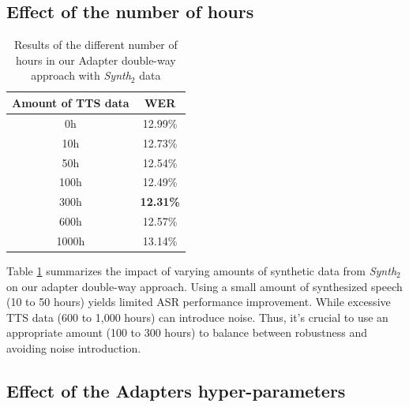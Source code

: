 
\subsection{Effect of the number of hours}
\begin{table}[t]
\centering
\begin{tabular}{cc}
\hline
 Amount of TTS data & WER    \\ \hline
\multicolumn{1}{c}{0h} & 12.99\% \\ \hline
\multicolumn{1}{c}{10h}  &   12.73\%   \\ 
\multicolumn{1}{c}{50h}    & 12.54\%   \\ 
\multicolumn{1}{c}{100h} & 12.49\%  \\ 
\multicolumn{1}{c}{300h} & \textbf{12.31\%}  \\ 
\multicolumn{1}{c}{600h} & 12.57\%  \\ 
\multicolumn{1}{c}{1000h} & 13.14\%  \\ \hline

\end{tabular}

\caption{Results of the different number of hours in our Adapter double-way approach with \textit{Synth$_2$} data}
\label{tab:hours}
\end{table}

Table \ref{tab:hours} summarizes the impact of varying amounts of synthetic data from \textit{Synth$_2$} on our adapter double-way approach. Using a small amount of synthesized speech (10 to 50 hours) yields limited ASR performance improvement. While excessive TTS data (600 to 1,000 hours) can introduce noise. Thus, it's crucial to use an appropriate amount (100 to 300 hours) to balance between robustness and avoiding noise introduction.
\subsection{Effect of the Adapters hyper-parameters}

